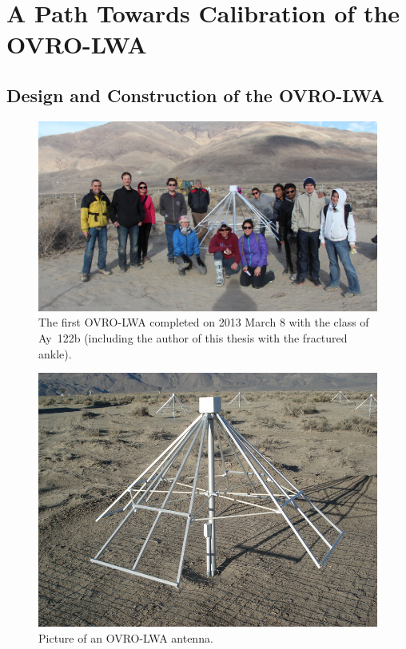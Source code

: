 \chapter{A Path Towards Calibration of the OVRO-LWA}
\label{chapter2}

\begin{bibunit}

\section{Design and Construction of the OVRO-LWA}

\begin{figure}
    \centering
    \includegraphics[width=\textwidth]{figures/chapter2/first-antenna}
    \caption{
        The first OVRO-LWA completed on 2013 March 8 with the class of Ay~122b (including the author
        of this thesis with the fractured ankle).
    }
    \label{fig:ovro-first-antenna}
\end{figure}

\begin{figure}[t]
    \centering
    \includegraphics[width=\textwidth]{figures/chapter2/lwa-antenna}
    \caption{
        Picture of an OVRO-LWA antenna.
    }
    \label{fig:ovro-lwa-pictures}
\end{figure}


\end{bibunit}
